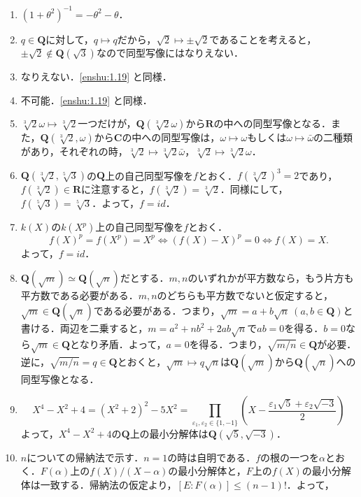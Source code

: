 \documentclass[a4paper,10pt]{ltjsarticle}
\begin{document}
\begin{enumerate}[]
  \item \label{enshu:1.18} $(1 + \theta^2)^{-1} = -\theta^2 - \theta$．
  \item \label{enshu:1.19} $q \in \mathbf{Q}$に対して，$q \mapsto q$だから，$\sqrt{2} \mapsto \pm \sqrt{2}$であることを考えると，$\pm \sqrt{2} \notin \mathbf{Q}(\sqrt{3})$なので同型写像にはなりえない．
  \item \label{enshu:1.20} なりえない．\ref{enshu:1.19} と同様．
  \item \label{enshu:1.21} 不可能．\ref{enshu:1.19} と同様．
  \item \label{enshu:1.22} $\sqrt[3]{2} \omega \mapsto \sqrt[3]{2}$一つだけが，$\mathbf{Q}(\sqrt[3]{2} \omega)$から$\mathbf{R}$の中への同型写像となる．また，$\mathbf{Q}(\sqrt[3]{2}, \omega)$から$\mathbf{C}$の中への同型写像は，$\omega \mapsto \omega$もしくは$\omega \mapsto \bar{\omega}$の二種類があり，それぞれの時，$\sqrt[3]{2} \mapsto \sqrt[3]{2} \bar{\omega}$，$\sqrt[3]{2} \mapsto \sqrt[3]{2}\omega$．
  \item \label{enshu:1.23} $\mathbf{Q}(\sqrt[3]{2}, \sqrt[5]{3})$の$\mathbf{Q}$上の自己同型写像を$f$とおく．$f(\sqrt[3]{2})^3 = 2$であり，$f(\sqrt[3]{2}) \in \mathbf{R}$に注意すると，$f(\sqrt[3]{2}) = \sqrt[3]{2}$．同様にして，$f(\sqrt[5]{3}) = \sqrt[5]{3}$．よって，$f = id$．
  \item \label{enshu:1.24} $k(X)$の$k(X^p)$上の自己同型写像を$f$とおく．
  \[ f(X)^p = f(X^p) = X^p \Longleftrightarrow (f(X) - X)^p = 0 \Longleftrightarrow f(X) = X.\]
  よって，$f = id$．
  \item \label{enshu:1.25} $\mathbf{Q}(\sqrt{m}) \simeq \mathbf{Q}(\sqrt{n})$だとする．$m, n$のいずれかが平方数なら，もう片方も平方数である必要がある．$m, n$のどちらも平方数でないと仮定すると，$\sqrt{m} \in \mathbf{Q}(\sqrt{n})$である必要がある．つまり，$\sqrt{m} = a + b\sqrt{n} \ (a, b \in \mathbf{Q})$と書ける．両辺を二乗すると，$m = a^2 + nb^2 + 2ab\sqrt{n}$で$ab = 0$を得る．$b = 0$なら$\sqrt{m} \in \mathbf{Q}$となり矛盾．よって，$a = 0$を得る．つまり，$\sqrt{m / n} \in \mathbf{Q}$が必要．逆に，$\sqrt{m / n} = q \in \mathbf{Q}$とおくと，$\sqrt{m} \mapsto q\sqrt{n}$は$\mathbf{Q}(\sqrt{m})$から$\mathbf{Q}(\sqrt{n})$への同型写像となる．
  \item \label{enshu:1.26} 
  \[ X^4 - X^2 + 4 = (X^2 + 2)^2 - 5X^2 = \prod_{\varepsilon_1, \varepsilon_2 \in \{1, -1\}}\left(X - \frac{\varepsilon_1 \sqrt{5} + \varepsilon_2 \sqrt{-3}}{2} \right) \]
  よって，$X^4 - X^2 + 4$の$\mathbf{Q}$上の最小分解体は$\mathbf{Q}(\sqrt{5}, \sqrt{-3})$．
  \item \label{enshu:1.27} $n$についての帰納法で示す．$n = 1$の時は自明である．$f$の根の一つを$\alpha$とおく．$F(\alpha)$上の$f(X) / (X - \alpha)$の最小分解体と，$F$上の$f(X)$の最小分解体は一致する．帰納法の仮定より，$[E : F(\alpha)] \le (n - 1)!$．よって，

\end{enumerate}
\end{document}
